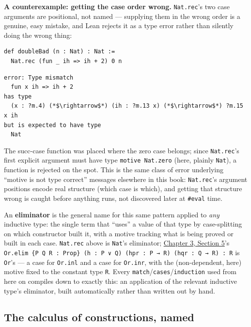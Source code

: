 \textbf{A counterexample: getting the case order wrong.} \texttt{Nat.rec}'s two case arguments are positional, not named --- supplying them in the wrong order is a genuine, easy mistake, and Lean rejects it as a type error rather than silently doing the wrong thing:

\begin{lstlisting}
def doubleBad (n : Nat) : Nat :=
  Nat.rec (fun _ ih => ih + 2) 0 n
\end{lstlisting}

\begin{lstlisting}
error: Type mismatch
  fun x ih => ih + 2
has type
  (x : ?m.4) (*$\rightarrow$*) (ih : ?m.13 x) (*$\rightarrow$*) ?m.15 x ih
but is expected to have type
  Nat
\end{lstlisting}

The succ-case function was placed where the zero case belongs; since \texttt{Nat.rec}'s first explicit argument must have type \texttt{motive Nat.zero} (here, plainly \texttt{Nat}), a function is rejected on the spot. This is the same class of error underlying ``motive is not type correct'' messages elsewhere in this book: \texttt{Nat.rec}'s argument positions encode real structure (which case is which), and getting that structure wrong is caught before anything runs, not discovered later at \texttt{\#eval} time.

An \textbf{eliminator} is the general name for this same pattern applied to \emph{any} inductive type: the single term that ``uses'' a value of that type by case-splitting on which constructor built it, with a motive tracking what is being proved or built in each case. \texttt{Nat.rec} above is \texttt{Nat}'s eliminator; \hyperref[sec:03-propositions-and-proofs:05-and-or-not:1]{Chapter 3, Section 5}'s \texttt{Or.elim \{P Q R : Prop\} (h : P ∨ Q) (hpr : P → R) (hqr : Q → R) : R} is \texttt{Or}'s --- a case for \texttt{Or.inl} and a case for \texttt{Or.inr}, with the (non-dependent, here) motive fixed to the constant type \texttt{R}. Every \texttt{match}/\texttt{cases}/\texttt{induction} used from here on compiles down to exactly this: an application of the relevant inductive type's eliminator, built automatically rather than written out by hand.

\subsection{The calculus of constructions, named}\label{sec:01-basics:05-pi-sigma-and-coc:8}

